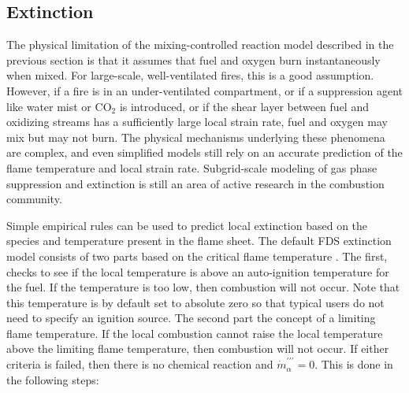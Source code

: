 
\subsection{Extinction}

\label{extinction}

The physical limitation of the mixing-controlled reaction model described in the previous section is that it assumes that fuel and oxygen burn instantaneously when mixed. For large-scale, well-ventilated
fires, this is a good assumption. However, if a fire is in an
under-ventilated compartment, or if a suppression agent like water
mist or CO$_2$ is introduced, or if the shear layer between fuel and oxidizing streams
has a sufficiently large local strain rate,
fuel and oxygen may mix but may not burn.
The physical mechanisms underlying these phenomena are complex, and
even simplified models still rely on an accurate prediction
of the flame temperature and local strain rate.
Subgrid-scale modeling of gas phase suppression and
extinction is still an area of active research in the combustion
community.

Simple empirical rules can be used to predict local
extinction based on the species and temperature present in the flame sheet.  The default FDS extinction model consists of two parts based on the critical flame temperature \cite{SFPE:Beyler}. The first, checks to see if the local temperature is above an auto-ignition temperature for the fuel.  If the temperature is too low, then combustion will not occur.  Note that this temperature is by default set to absolute zero so that typical users do not need to specify an ignition source.  The second part the concept of a limiting flame temperature.  If the local combustion cannot raise the local temperature above the limiting flame temperature, then combustion will not occur. If either criteria is failed, then there is no chemical reaction and $\dot{m}^{\prime\prime\prime}_{\alpha}=0$. This is done in the following steps:


